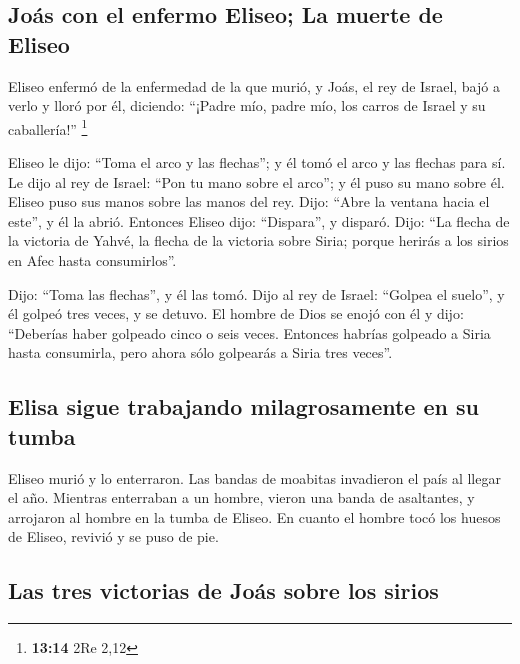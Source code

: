 \hypertarget{jouxe1s-con-el-enfermo-eliseo-la-muerte-de-eliseo}{%
\subsection{Joás con el enfermo Eliseo; La muerte de
Eliseo}\label{jouxe1s-con-el-enfermo-eliseo-la-muerte-de-eliseo}}

 Eliseo enfermó de la enfermedad de la que murió, y Joás,
el rey de Israel, bajó a verlo y lloró por él, diciendo: ``¡Padre mío,
padre mío, los carros de Israel y su caballería!'' \footnote{\textbf{13:14}
  2Re 2,12}

 Eliseo le dijo: ``Toma el arco y las flechas''; y él
tomó el arco y las flechas para sí.  Le dijo al rey de
Israel: ``Pon tu mano sobre el arco''; y él puso su mano sobre él.
Eliseo puso sus manos sobre las manos del rey.  Dijo:
``Abre la ventana hacia el este'', y él la abrió. Entonces Eliseo dijo:
``Dispara'', y disparó. Dijo: ``La flecha de la victoria de Yahvé, la
flecha de la victoria sobre Siria; porque herirás a los sirios en Afec
hasta consumirlos''.

 Dijo: ``Toma las flechas'', y él las tomó. Dijo al rey
de Israel: ``Golpea el suelo'', y él golpeó tres veces, y se detuvo.
 El hombre de Dios se enojó con él y dijo: ``Deberías
haber golpeado cinco o seis veces. Entonces habrías golpeado a Siria
hasta consumirla, pero ahora sólo golpearás a Siria tres veces''.

\hypertarget{elisa-sigue-trabajando-milagrosamente-en-su-tumba}{%
\subsection{Elisa sigue trabajando milagrosamente en su
tumba}\label{elisa-sigue-trabajando-milagrosamente-en-su-tumba}}

 Eliseo murió y lo enterraron. Las bandas de moabitas
invadieron el país al llegar el año.  Mientras enterraban
a un hombre, vieron una banda de asaltantes, y arrojaron al hombre en la
tumba de Eliseo. En cuanto el hombre tocó los huesos de Eliseo, revivió
y se puso de pie.

\hypertarget{las-tres-victorias-de-jouxe1s-sobre-los-sirios}{%
\subsection{Las tres victorias de Joás sobre los
sirios}\label{las-tres-victorias-de-jouxe1s-sobre-los-sirios}}

